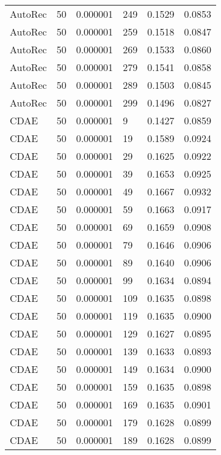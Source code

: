 \begin{tabular}{llrlrr}
 AutoRec &   50 &  0.000001 &   249 &  0.1529 &       0.0853 \\
 AutoRec &   50 &  0.000001 &   259 &  0.1518 &       0.0847 \\
 AutoRec &   50 &  0.000001 &   269 &  0.1533 &       0.0860 \\
 AutoRec &   50 &  0.000001 &   279 &  0.1541 &       0.0858 \\
 AutoRec &   50 &  0.000001 &   289 &  0.1503 &       0.0845 \\
 AutoRec &   50 &  0.000001 &   299 &  0.1496 &       0.0827 \\
    CDAE &   50 &  0.000001 &     9 &  0.1427 &       0.0859 \\
    CDAE &   50 &  0.000001 &    19 &  0.1589 &       0.0924 \\
    CDAE &   50 &  0.000001 &    29 &  0.1625 &       0.0922 \\
    CDAE &   50 &  0.000001 &    39 &  0.1653 &       0.0925 \\
    CDAE &   50 &  0.000001 &    49 &  0.1667 &       0.0932 \\
    CDAE &   50 &  0.000001 &    59 &  0.1663 &       0.0917 \\
    CDAE &   50 &  0.000001 &    69 &  0.1659 &       0.0908 \\
    CDAE &   50 &  0.000001 &    79 &  0.1646 &       0.0906 \\
    CDAE &   50 &  0.000001 &    89 &  0.1640 &       0.0906 \\
    CDAE &   50 &  0.000001 &    99 &  0.1634 &       0.0894 \\
    CDAE &   50 &  0.000001 &   109 &  0.1635 &       0.0898 \\
    CDAE &   50 &  0.000001 &   119 &  0.1635 &       0.0900 \\
    CDAE &   50 &  0.000001 &   129 &  0.1627 &       0.0895 \\
    CDAE &   50 &  0.000001 &   139 &  0.1633 &       0.0893 \\
    CDAE &   50 &  0.000001 &   149 &  0.1634 &       0.0900 \\
    CDAE &   50 &  0.000001 &   159 &  0.1635 &       0.0898 \\
    CDAE &   50 &  0.000001 &   169 &  0.1635 &       0.0901 \\
    CDAE &   50 &  0.000001 &   179 &  0.1628 &       0.0899 \\
    CDAE &   50 &  0.000001 &   189 &  0.1628 &       0.0899 \\

\end{tabular}
